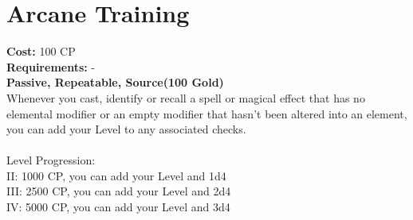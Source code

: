 \section{Arcane Training}
\textbf{Cost:} 100 CP\\
\textbf{Requirements:} -\\
\textbf{Passive, Repeatable, Source(100 Gold)}\\
Whenever you cast, identify or recall a spell or magical effect that has no elemental modifier or an empty modifier that hasn't been altered into an element, you can add your Level to any associated checks.\\
\\
Level Progression:\\
II: 1000 CP, you can add your Level and 1d4\\
III: 2500 CP, you can add your Level and 2d4\\
IV: 5000 CP, you can add your Level and 3d4\\